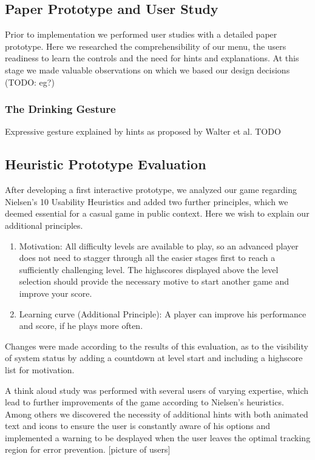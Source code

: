 \documentclass{chi-ext}
\begin{document}
\subsection{Paper Prototype and User Study}
Prior to implementation we performed user studies with a detailed paper prototype. Here we researched the comprehensibility of our menu, the users readiness to learn the controls and the need for hints and explanations. At this stage we made valuable observations on which we based our design decisions (TODO: eg?)
\subsubsection{The Drinking Gesture}
Expressive gesture explained by hints as proposed by Walter et al. \cite{walter2013strikeapose} TODO

\subsection{Heuristic Prototype Evaluation}
After developing a first interactive prototype, we  analyzed our game regarding Nielsen’s 10 Usability Heuristics \cite{nielsen1995usability} and added two further principles, which we deemed essential for a casual game in public context. Here we wish to explain our additional principles.

\begin{enumerate}
	\item Motivation: All difficulty levels are available to play, so an advanced player does not need to stagger through all the easier stages first to reach a sufficiently challenging level. The highscores displayed above the level selection should provide the necessary motive to start another game and improve your score.
	\item Learning curve (Additional Principle): A player can improve his performance and score, if he plays more often.
\end{enumerate}
Changes were made according to the results of this evaluation, as to the visibility of system status by adding a countdown at level start and including a highscore list for motivation.

A think aloud study was performed with several users of varying expertise, which lead to further improvements of the game according to Nielsen's heuristics. Among others we discovered the necessity of additional hints with both animated text and icons to ensure the user is constantly aware of his options and implemented a warning to be desplayed when the user leaves the optimal tracking region for error prevention. [picture of users]
\end{document}
